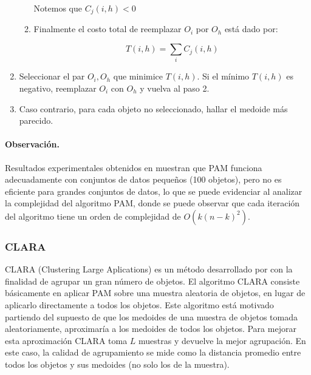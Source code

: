 \documentclass[12pt,oneside]{book}\usepackage[]{graphicx}\usepackage[]{color}
\theoremstyle{definition} %
\begin{document}
\begin{enumerate}
\begin{enumerate}
Notemos que $C_{j}(i,h)<0$

\item Finalmente el costo total de reemplazar $O_i$ por $O_h$ está dado por:

$$T(i,h)= \sum_{i} C_{j}(i,h)$$

\end{enumerate} 





\item Seleccionar el par $O_i, O_h$ que minimice $T(i,h)$. Si el mínimo $T(i,h)$ es negativo, reemplazar $O_i$ con $O_h$ y vuelva al paso 2. 
\item Caso contrario, para cada objeto no seleccionado, hallar el medoide más parecido.  
\end{enumerate}

\paragraph{Observación.} Resultados experimentales obtenidos en \citeauthor{rousseeuw1990finding} \citeyear{rousseeuw1990finding} muestran que PAM funciona adecuadamente con conjuntos de datos pequeños (100 objetos), pero no es eficiente para grandes conjuntos de datos, lo que se puede evidenciar al analizar la complejidad del algoritmo PAM, donde se puede observar que cada iteración del algoritmo tiene un orden de complejidad de $O(k(n-k)^2)$.











\subsubsection{CLARA}
CLARA (Clustering Large Aplications) es un método desarrollado por \citeauthor{rousseeuw1990finding} con la finalidad de agrupar un gran número de objetos. El algoritmo CLARA consiste básicamente  en aplicar PAM sobre una muestra aleatoria de objetos, en lugar de aplicarlo directamente a todos los objetos. Este algoritmo está motivado partiendo del supuesto  de que los medoides de una muestra de objetos tomada aleatoriamente, aproximaría a los medoides de todos los objetos. Para mejorar esta aproximación CLARA toma $L$ muestras  y devuelve la mejor agrupación. En este caso, la calidad de agrupamiento se mide como la distancia promedio entre todos los objetos y sus medoides (no solo los de la muestra).
\end{document}
